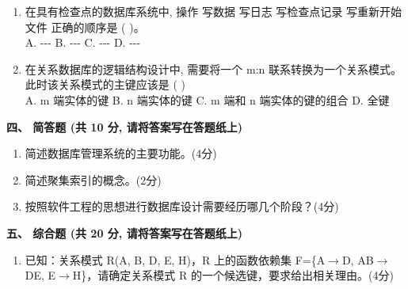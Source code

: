 \documentclass{ctexart} %
\begin{document}
\begin{enumerate}[label=\arabic*., resume]
    \item 在具有检查点的数据库系统中, 操作 写数据 写日志 写检查点记录 写重新开始文件 正确的顺序是 ( )。\\
    A. --- \quad B. --- \quad C. --- \quad D. ---
    \item 在关系数据库的逻辑结构设计中, 需要将一个 m:n 联系转换为一个关系模式。此时该关系模式的主键应该是 ( ) \\
    A. m 端实体的键 \quad B. n 端实体的键 \quad C. m 端和 n 端实体的键的组合 \quad D. 全键
\end{enumerate}

\vspace{2em}

\raggedright
\textbf{\large 四、 简答题 (共 10 分, 请将答案写在答题纸上)} %
\vspace{1em}

\begin{enumerate}[label=\arabic*.]
    \item 简述数据库管理系统的主要功能。(4分)
    \item 简述聚集索引的概念。(2分)
    \item 按照软件工程的思想进行数据库设计需要经历哪几个阶段？(4分)
\end{enumerate}

\vspace{2em}

\raggedright
\textbf{\large 五、 综合题 (共 20 分, 请将答案写在答题纸上)}
\vspace{1em}

\begin{enumerate}[label=\arabic*.]
    \item 已知：关系模式 R(A, B, D, E, H)，R 上的函数依赖集 F=\{A$\rightarrow$D, AB$\rightarrow$DE, E$\rightarrow$H\}，请确定关系模式 R 的一个候选键，要求给出相关理由。(4分)
\end{enumerate}
\end{document}
